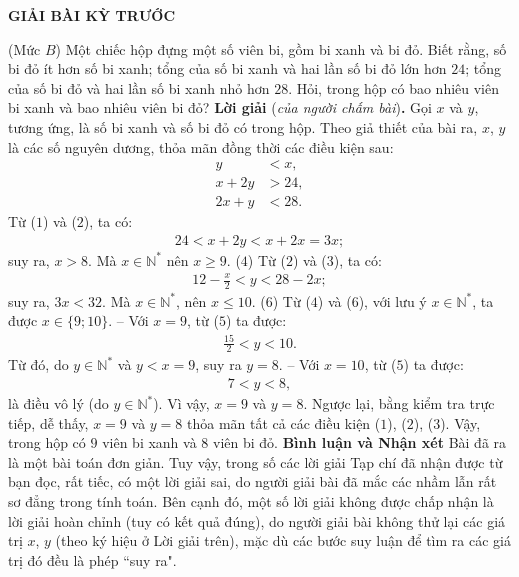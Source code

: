 \newpage
\centerline{{\large{\textbf{\color{thachthuctoanhoc}\color{thachthuctoanhoc}GIẢI BÀI KỲ TRƯỚC}}}}
\vspace*{-5pt}
\begin{multicols}{2}
	{}
	(Mức $B$) Một chiếc hộp đựng một số viên bi, gồm bi xanh và bi đỏ. Biết rằng, số bi đỏ ít hơn số bi xanh; tổng của số bi xanh và hai lần số bi đỏ lớn hơn $24$; tổng của số bi đỏ và hai lần số bi xanh nhỏ hơn $28$. Hỏi, trong hộp có bao nhiêu viên bi xanh và bao nhiêu viên bi đỏ?
	\vskip 0.05cm
	\textbf{\color{thachthuctoanhoc}Lời giải} (\textit{của người chấm bài})\textbf{\color{thachthuctoanhoc}.}
	\vskip 0.05cm
	Gọi $x$ và $y$, tương ứng, là số bi xanh và số bi đỏ có trong hộp.
	\vskip 0.05cm
	Theo giả thiết của bài ra, $x$, $y$ là các số nguyên dương, thỏa mãn đồng thời các điều kiện sau:
	\begin{align*}
		y &< x, \tag{$1$}\\
		x + 2y &> 24, \tag{$2$}\\
		2x + y &< 28. \tag{$3$}  
	\end{align*}
	Từ ($1$) và ($2$), ta có:
	\begin{align*}
		24 < x + 2y < x + 2x = 3x;
	\end{align*}
	suy ra, $x > 8$. Mà $x \in \mathbb{N^*}$  nên $x \ge  9$. \hfill ($4$)
	\vskip 0.05cm
	Từ ($2$) và ($3$), ta có:
	\begin{align*}
		12 - \frac{x}{2} < y < 28-2x; \tag{$5$}
	\end{align*}
	suy ra, $3x < 32$. Mà $x \in \mathbb{N^*}$, nên $x \le 10$. \hfill ($6$)
	\vskip 0.05cm
	Từ ($4$) và ($6$), với lưu ý $x \in \mathbb{N^*}$,  ta được \linebreak $x \in \{9; 10\}$.
	\vskip 0.05cm
	-- Với $x = 9$, từ ($5$) ta được:
	\begin{align*}
		\frac{15}{2} < y < 10.
	\end{align*}
	Từ đó, do $y \in \mathbb{N^*}$ và $y < x = 9$, suy ra $y = 8$.
	\vskip 0.05cm
	-- Với $x = 10$, từ ($5$) ta được:
	\begin{align*}
		7 < y < 8,
	\end{align*}
	là điều vô lý (do $y \in \mathbb{N^*}$).
	\vskip 0.05cm
	Vì vậy, $x = 9$ và $y = 8$.
	\vskip 0.05cm
	Ngược lại, bằng kiểm tra trực tiếp, dễ thấy, $x = 9$ và $y = 8$ thỏa mãn tất cả các điều kiện ($1$), ($2$), ($3$).
	\vskip 0.05cm
	Vậy, trong hộp có $9$ viên bi xanh và $8$ viên bi đỏ.
	\vskip 0.05cm
	\textbf{\color{thachthuctoanhoc}Bình luận và Nhận xét}
	\vskip 0.05cm	
	Bài đã ra là một bài toán đơn giản. Tuy vậy, trong số các lời giải Tạp chí đã nhận được từ bạn đọc, rất tiếc, có một lời giải sai, do người giải bài đã mắc các nhầm lẫn rất sơ đẳng trong tính toán. Bên cạnh đó, một số lời giải không được chấp nhận là lời giải hoàn chỉnh (tuy có kết quả đúng), do người giải bài không thử lại các giá trị $x$, $y$ (theo ký hiệu ở Lời giải trên), mặc dù các bước suy luận để tìm ra các giá trị đó đều là phép ``suy ra".

\end{multicols}
